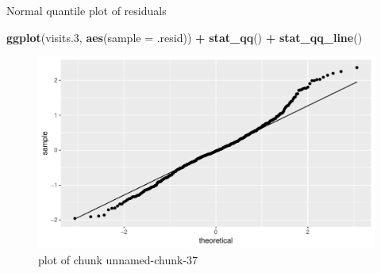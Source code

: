 \documentclass[ignorenonframetext,]{beamer}
\newenvironment{Shaded}{\begin{snugshade}}{\end{snugshade}}
\newcommand{\DataTypeTok}[1]{\textcolor[rgb]{0.13,0.29,0.53}{#1}}
\newcommand{\FloatTok}[1]{\textcolor[rgb]{0.00,0.00,0.81}{#1}}
\newcommand{\KeywordTok}[1]{\textcolor[rgb]{0.13,0.29,0.53}{\textbf{#1}}}
\newcommand{\NormalTok}[1]{#1}
\newcommand{\OperatorTok}[1]{\textcolor[rgb]{0.81,0.36,0.00}{\textbf{#1}}}
\newcommand{\StringTok}[1]{\textcolor[rgb]{0.31,0.60,0.02}{#1}}
\begin{document}
\begin{frame}[fragile]{Normal quantile plot of residuals}
\protect\hypertarget{normal-quantile-plot-of-residuals-1}{}

\begin{Shaded}
\begin{Highlighting}[]
\KeywordTok{ggplot}\NormalTok{(visits}\FloatTok{.3}\NormalTok{, }\KeywordTok{aes}\NormalTok{(}\DataTypeTok{sample =}\NormalTok{ .resid)) }\OperatorTok{+}\StringTok{ }\KeywordTok{stat_qq}\NormalTok{() }\OperatorTok{+}\StringTok{ }\KeywordTok{stat_qq_line}\NormalTok{()}
\end{Highlighting}
\end{Shaded}

\begin{figure}
\centering
\includegraphics{figure/unnamed-chunk-37-1.pdf}
\caption{plot of chunk unnamed-chunk-37}
\end{figure}

\end{frame}
\end{document}
